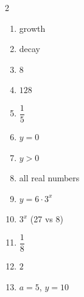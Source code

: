 \documentclass[11pt]{article}
\begin{document}
\begin{keybox}
\begin{multicols}{2}
\small
\begin{enumerate}[leftmargin=*,itemsep=3pt]
  \item growth
  \item decay
  \item $8$
  \item $128$
  \item $\dfrac{1}{5}$
  \item $y=0$
  \item $y>0$
  \item all real numbers
  \item $y=6\cdot3^{x}$
  \item $3^{x}$ (27 vs 8)
  \item $\dfrac{1}{8}$
  \item $2$
  \item $a=5$, $y=10$
\end{enumerate}
\end{multicols}
\end{keybox}
\end{document}
